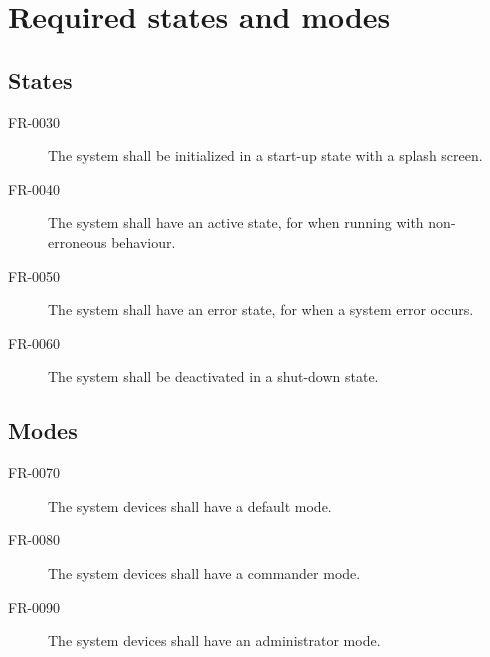\section{Required states and modes}

\subsection{States}
\begin{description}
  \item[FR-0030] The system shall be initialized in a start-up state with a splash screen.
  \item[FR-0040] The system shall have an active state, for when running with non-erroneous behaviour.
  \item[FR-0050] The system shall have an error state, for when a system error occurs.
  \item[FR-0060] The system shall be deactivated in a shut-down state.
\end{description}

\subsection{Modes}
\begin{description}
  \item[FR-0070] The system devices shall have a default mode.
  \item[FR-0080] The system devices shall have a commander mode.
  \item[FR-0090] The system devices shall have an administrator mode.
\end{description}